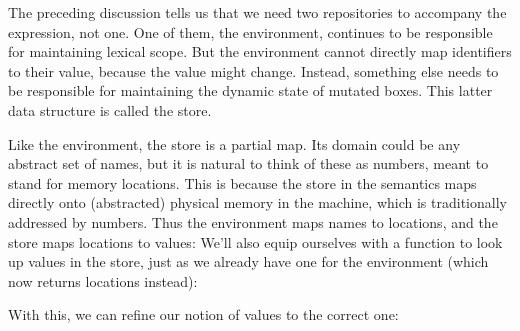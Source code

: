 
The preceding discussion tells us that we need two repositories to accompany the
expression, not one. One of them, the environment, continues to be responsible
for maintaining lexical scope. But the environment cannot directly map
identifiers to their value, because the value might change. Instead, something
else needs to be responsible for maintaining the dynamic state of mutated boxes.
This latter data structure is called the store.

Like the environment, the store is a partial map. Its domain could be any
abstract set of names, but it is natural to think of these as numbers, meant to
stand for memory locations. This is because the store in the semantics maps
directly onto (abstracted) physical memory in the machine, which is
traditionally addressed by numbers. Thus the environment maps names to
locations, and the store maps locations to values:
We’ll also equip ourselves with a function to look up values in the store, just
as we already have one for the environment (which now returns locations
instead):

With this, we can refine our notion of values to the correct one:

